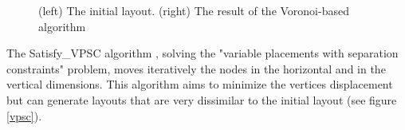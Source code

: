 \documentclass[12pt]{report}
\begin{document}
\begin{figure}[h]
  \setlength\fboxsep{5pt}
  \setlength\fboxrule{0.5pt}
  \caption{(left) The initial layout. (right) The result of the Voronoi-based algorithm}
  \label{voronoi}
\end{figure}

The Satisfy\_VPSC algorithm \cite{VPSC06}, solving the "variable placements with separation constraints" problem, moves iteratively the nodes in the horizontal and in the vertical dimensions. This algorithm aims to minimize the vertices displacement but can generate layouts that are very dissimilar to the initial layout (see figure \ref{vpsc}).
\end{document}
